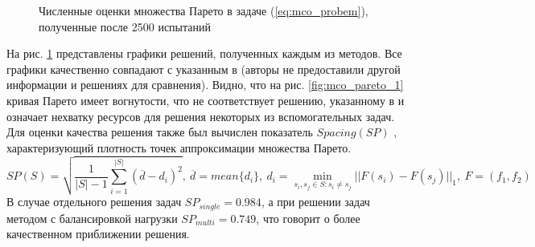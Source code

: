 \begin{figure}[ht]
    \centering
    \caption{Численные оценки множества Парето в задаче (\ref{eq:mco_probem}), полученные после 2500 испытаний}
    \label{fig:mco_pareto}
\end{figure}

На рис. \ref{fig:mco_pareto} представлены графики решений, полученных каждым из методов.
Все графики качественно совпадают с указанным в \cite{BinhKorn1999} (авторы не предоставили другой
информации и решениях для сравнения). Видно, что на рис. \ref{fig:mco_pareto_1}
кривая Парето имеет вогнутости, что не соответствует решению, указанному в \cite{BinhKorn1999} и
означает нехватку ресурсов для решения некоторых из вспомогательных задач.
Для оценки качества решения также был вычислен показатель \(Spacing(SP)\) \cite{RiquelmeLucken2015},
характеризующий плотность точек аппроксимации множества Парето.
\begin{displaymath}
  SP(S)=\sqrt{\frac{1}{|S|-1} \sum_{i=1}^{|S|} (\overline{d}-d_i)^2},
  \:\overline{d}=mean\{d_i\},\:d_i=\min_{s_i,s_j\in S:s_i\ne s_j}||F(s_i)-F(s_j)||_1,\: F=(f_1,f_2)
\end{displaymath}
В случае отдельного решения задач \(SP_{single}=0.984\), а при решении задач методом с балансировкой нагрузки
\(SP_{multi}=0.749\), что говорит о более качественном приближении решения.

